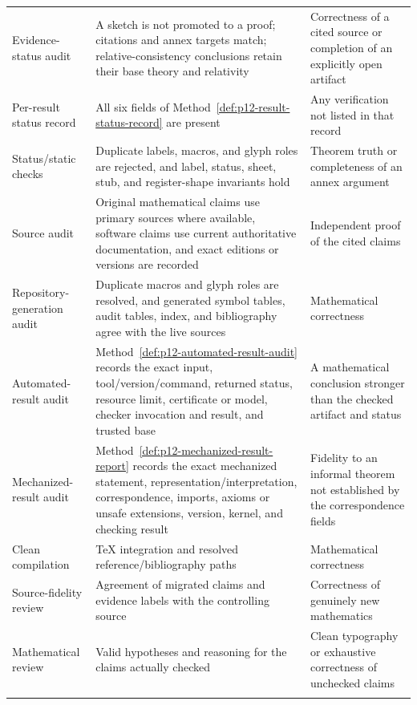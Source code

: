 \begin{landscape}
\begin{longtable}{@{}p{1.40in}p{2.35in}p{3.35in}@{}}
\addlinespace
Evidence-status audit & A sketch is not promoted to a proof; citations and
annex targets match; relative-consistency conclusions retain their base theory
and relativity & Correctness of a cited source or completion of an explicitly
open artifact \\ \addlinespace
Per-result status record & All six fields of
Method~\ref{def:p12-result-status-record} are present & Any verification not
listed in that record \\ \addlinespace
Status/static checks & Duplicate labels, macros, and glyph roles are rejected,
and label, status, sheet, stub, and register-shape invariants hold & Theorem
truth or completeness of an annex argument \\ \addlinespace
Source audit & Original mathematical claims use primary sources where
available, software claims use current authoritative documentation, and exact
editions or versions are recorded & Independent proof of the cited claims \\
\addlinespace
Repository-generation audit & Duplicate macros and glyph roles are resolved,
and generated symbol tables, audit tables, index, and bibliography agree with
the live sources & Mathematical correctness \\ \addlinespace
Automated-result audit & Method~\ref{def:p12-automated-result-audit} records
the exact input, tool/version/command, returned status, resource limit,
certificate or model, checker invocation and result, and trusted base & A
mathematical conclusion stronger than the checked artifact and status \\
\addlinespace
Mechanized-result audit & Method~\ref{def:p12-mechanized-result-report} records
the exact mechanized statement, representation/interpretation, correspondence,
imports, axioms or unsafe extensions, version, kernel, and checking result &
Fidelity to an informal theorem not established by the correspondence fields \\
\addlinespace
Clean compilation & TeX integration and resolved reference/bibliography paths &
Mathematical correctness \\ \addlinespace
Source-fidelity review & Agreement of migrated claims and evidence labels with
the controlling source & Correctness of genuinely new mathematics \\ \addlinespace
Mathematical review & Valid hypotheses and reasoning for the claims actually
checked & Clean typography or exhaustive correctness of unchecked claims \\
\addlinespace

\end{longtable}
\end{landscape}
